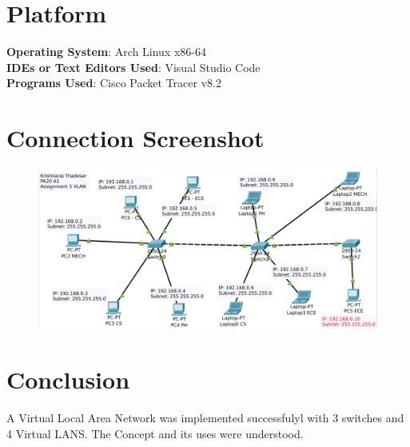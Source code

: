 \documentclass[11pt]{article}
\begin{document}
\section{Platform}
\textbf{Operating System}: Arch Linux x86-64\\
\textbf{IDEs or Text Editors Used}: Visual Studio Code\\
\textbf{Programs Used}: Cisco Packet Tracer v8.2

\section{Connection Screenshot}


\begin{figure}[H]
	\centering
	\includegraphics[scale=0.35]{../Screenshots/Assignment_3_screenshot.png}
\end{figure}


\section{Conclusion}
A Virtual Local Area Network was implemented successfulyl with 3 switches and 4 Virtual LANS. The Concept and its uses were understood.
\end{document}

